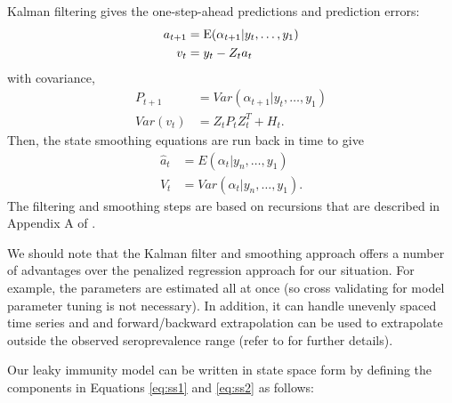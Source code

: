 \documentclass{article}
\begin{document}
Kalman filtering gives the one-step-ahead predictions and prediction errors:
\begin{align*}
a_{t+1} &= \textup{E}(\alpha_{t+1}|y_t, \dots, y_1) \\
v_t &= y_t - Z_ta_t
\end{align*} with covariance, 
\begin{align*}
P_{t+1} &= Var(\alpha_{t+1}|y_t, \dots, y_1) \\
Var(v_t) &= Z_tP_tZ_t^T + H_t.
\end{align*}
Then, the state smoothing equations are run back in time to give
\begin{align}
\hat{a}_t &= E(\alpha_{t}|y_n, \dots, y_1) \label{eq:hatat}\\
V_t &= Var(\alpha_{t}|y_n, \dots, y_1). \label{eq:Vt}
\end{align}
The filtering and smoothing steps are based on recursions that are described in Appendix A of \citep{helske2016kfas}. 

We should note that the Kalman filter and smoothing approach offers a number of advantages over the penalized regression approach for our situation. For example, the parameters are estimated all at once (so cross validating for model parameter tuning is not necessary). In addition, it can handle unevenly spaced time series and and forward/backward extrapolation can be used to extrapolate outside the observed seroprevalence range (refer to \citet{durbin2012time} for further details).

Our leaky immunity model can be written in state space form by defining the components in Equations \ref{eq:ss1} and \ref{eq:ss2} as follows:
\end{document}
